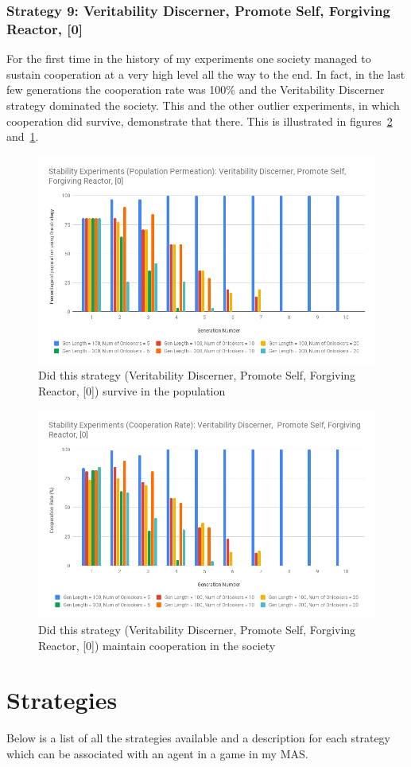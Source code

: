 \documentclass[]{final_report}
\begin{document}
\subsubsection{Strategy 9: Veritability Discerner, Promote Self, Forgiving Reactor, [0]} 
For the first time in the history of my experiments one society managed to sustain cooperation at a very high level all the way to the end. In fact, in the last few generations the cooperation rate was 100\% and the Veritability Discerner strategy dominated the society. This and the other outlier experiments, in which cooperation did survive, demonstrate that there. This is illustrated in figures~\ref{fig:vdpsfr0Coop} and~\ref{fig:vdpsfr0Pop}.
\begin{figure}
\begin{framed}
	\includegraphics[width=\textwidth]{vdpsfr0Pop.png}
	\caption{Did this strategy (Veritability Discerner, Promote Self, Forgiving Reactor, [0]) survive in the population}
	\label{fig:vdpsfr0Pop}
\end{framed}
\end{figure}
\begin{figure}
\begin{framed}
	\includegraphics[width=\textwidth]{vdpsfr0Coop.png}
	\caption{Did this strategy (Veritability Discerner, Promote Self, Forgiving Reactor, [0]) maintain cooperation in the society}
	\label{fig:vdpsfr0Coop}
\end{framed}
\end{figure}
\newpage

\section{Strategies}
\label{appendix:strats}
Below is a list of all the strategies available and a description for each strategy which can be associated with an agent in a game in my MAS.
\inputminted[breaklines]{json}{strategies.json}
\end{document}
